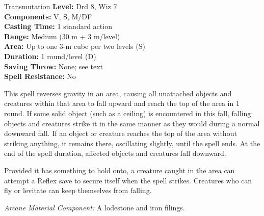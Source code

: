 {Transmutation}
{
	\textbf{Level:}
	Drd 8, Wiz 7\\
	\textbf{Components:}
	V, S, M/DF\\
	\textbf{Casting Time:}
	1 standard action\\
	\textbf{Range:}
	Medium (30 m + 3 m/level)\\
	\textbf{Area:}
	Up to one 3-m cube per two levels (S)\\
	\textbf{Duration:}
	1 round/level (D)\\
	\textbf{Saving Throw:}
	None; see text\\
	\textbf{Spell Resistance:}
	No\\
}
{
	This spell reverses gravity in an area, causing all unattached objects and creatures within that area to fall upward and reach the top of the area in 1 round. If some solid object (such as a ceiling) is encountered in this fall, falling objects and creatures strike it in the same manner as they would during a normal downward fall. If an object or creature reaches the top of the area without striking anything, it remains there, oscillating slightly, until the spell ends. At the end of the spell duration, affected objects and creatures fall downward.

	Provided it has something to hold onto, a creature caught in the area can attempt a Reflex save to secure itself when the spell strikes. Creatures who can fly or levitate can keep themselves from falling.

	\textit{Arcane Material Component:}
	A lodestone and iron filings.

}
